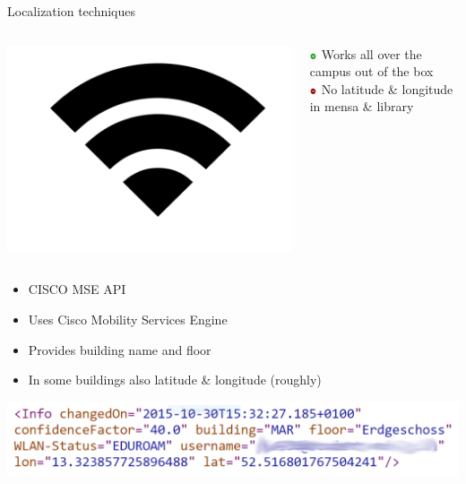 \documentclass[11pt]{beamer}
\begin{document}
\begin{frame}[t]{Localization techniques}

  \begin{columns}[c]

    \begin{column}{0.2\textwidth}
      \includegraphics[width=\textwidth]{wifi-symbol}
    \end{column}

    \hfill

    \begin{column}{0.8\textwidth}

      \includegraphics[width=0.05\textwidth]{plus} Works all over the campus out of the box\\
      \includegraphics[width=0.05\textwidth]{minus} No latitude \& longitude in mensa \& library

    \end{column}

  \end{columns}

  \begin{itemize}
    \setlength{\itemsep}{1pt}
    \setlength{\parskip}{0pt}
    \setlength{\parsep}{0pt}
    \item CISCO MSE API
    \item Uses Cisco Mobility Services Engine
    \item Provides building name and floor
    \item In some buildings also latitude \& longitude (roughly)
  \end{itemize}

  \begin{center}
	\includegraphics[width=\textwidth]{tubitapi_response}
   \end{center}

\end{frame}
\end{document}
